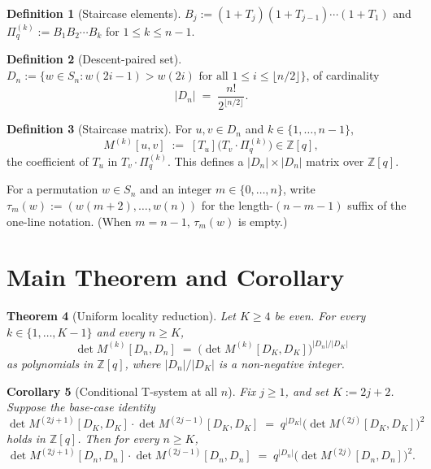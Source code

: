 \documentclass[11pt]{article}
\newtheorem{theorem}{Theorem}
\newtheorem{corollary}[theorem]{Corollary}
\theoremstyle{definition}
\newtheorem{definition}[theorem]{Definition}
\begin{document}
\begin{definition}[Staircase elements]
$B_j := (1+T_j)(1+T_{j-1})\cdots(1+T_1)$ and $\Pi^{(k)}_q := B_1 B_2 \cdots B_k$ for $1 \leq k \leq n-1$.
\end{definition}

\begin{definition}[Descent-paired set]
$D_n := \{ w \in S_n : w(2i-1) > w(2i) \text{ for all } 1 \leq i \leq \lfloor n/2 \rfloor\}$, of cardinality
\[
|D_n| \;=\; \frac{n!}{2^{\lfloor n/2 \rfloor}}.
\]
\end{definition}

\begin{definition}[Staircase matrix]
For $u, v \in D_n$ and $k \in \{1,\ldots,n-1\}$,
\[
M^{(k)}[u, v] \;:=\; [T_u]\bigl( T_v \cdot \Pi^{(k)}_q \bigr) \in \mathbb{Z}[q],
\]
the coefficient of $T_u$ in $T_v \cdot \Pi^{(k)}_q$. This defines a $|D_n| \times |D_n|$ matrix over $\mathbb{Z}[q]$.
\end{definition}

For a permutation $w \in S_n$ and an integer $m \in \{0,\ldots,n\}$, write $\tau_m(w) := (w(m+2), \ldots, w(n))$ for the length-$(n-m-1)$ suffix of the one-line notation.  (When $m = n-1$, $\tau_m(w)$ is empty.)

\section{Main Theorem and Corollary}

\begin{theorem}[Uniform locality reduction]\label{thm:uniform}
Let $K \geq 4$ be even. For every $k \in \{1, \ldots, K-1\}$ and every $n \geq K$,
\[
\det M^{(k)}[D_n, D_n] \;=\; \bigl(\det M^{(k)}[D_K, D_K]\bigr)^{|D_n|/|D_K|}
\]
as polynomials in $\mathbb{Z}[q]$, where $|D_n|/|D_K|$ is a non-negative integer.
\end{theorem}

\begin{corollary}[Conditional T-system at all $n$]\label{cor:tsystem}
Fix $j \geq 1$, and set $K := 2j+2$. Suppose the base-case identity
\begin{equation}\label{eq:base}
\det M^{(2j+1)}[D_K, D_K] \cdot \det M^{(2j-1)}[D_K, D_K]
\;=\; q^{|D_K|} \bigl(\det M^{(2j)}[D_K, D_K]\bigr)^2
\end{equation}
holds in $\mathbb{Z}[q]$.  Then for every $n \geq K$,
\[
\det M^{(2j+1)}[D_n, D_n] \cdot \det M^{(2j-1)}[D_n, D_n]
\;=\; q^{|D_n|} \bigl(\det M^{(2j)}[D_n, D_n]\bigr)^2.
\]
\end{corollary}
\end{document}
